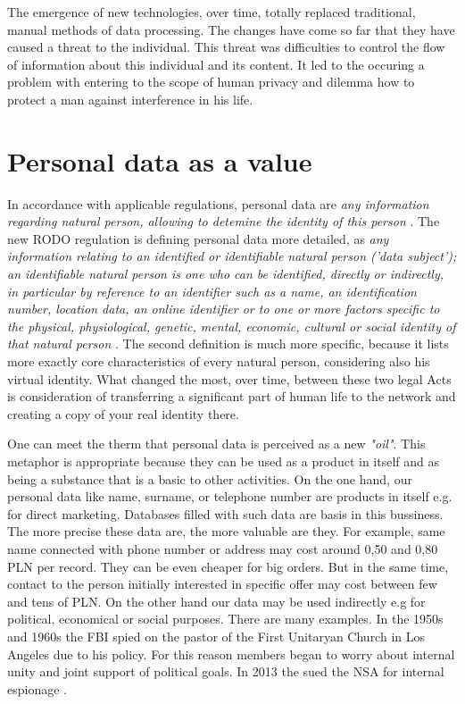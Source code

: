 \documentclass[en, noamssymb]{mgr}
\begin{document}
The emergence of new technologies, over time, totally replaced traditional, manual methods of data processing. The changes have come so far that they have caused a threat to the individual. This threat was difficulties to control the flow of information about this individual and its content. It led to the occuring a problem with entering to the scope of human privacy and dilemma how to protect a man against interference in his life.



\section{Personal data as a value}

In accordance with applicable regulations, personal data are \textit{any information regarding natural person, allowing to detemine the identity of this person} \cite{uodo_art6}. The new RODO regulation is defining personal data more detailed, as \textit{any information relating to an identified or identifiable natural person ('data subject'); an identifiable natural person is one who can be identified, directly or indirectly, in particular by reference to an identifier such as a name, an identification number, location data, an online identifier or to one or more factors specific to the physical, physiological, genetic, mental, economic, cultural or social identity of that natural person} \cite{rodo_art4}. The second definition is much more specific, because it lists more exactly core characteristics of every natural person, considering also his virtual identity. What changed the most, over time, between these two legal Acts is consideration of transferring a significant part of human life to the network and creating a copy of your real identity there.

\indent One can meet the therm that personal data is perceived as a new \textit{"oil"}. This metaphor is appropriate because they can be used as a product in itself and as being a substance that is a basic to other activities. On the one hand, our personal data like name, surname, or telephone number are products in itself e.g. for direct marketing. Databases filled with such data are basis in this bussiness. The more precise these data are, the more valuable are they. For example, same name connected with phone number or address may cost around 0,50 and 0,80 PLN per record. They can be even cheaper for big orders. But in the same time, contact to the person initially interested in specific offer may cost between few and tens of PLN. On the other hand our data may be used indirectly e.g for political, economical or social purposes. There are many examples. In the 1950s and 1960s the FBI spied on the pastor of the First Unitaryan Church in Los Angeles due to his policy. For this reason members began to worry about internal unity and joint support of political goals. In 2013 the sued the NSA for internal espionage \cite{dane_i_goliat}.
\end{document}
